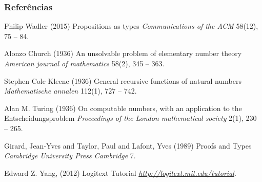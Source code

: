 \documentclass{beamer}
\begin{document}

\begin{frame}[allowframebreaks]
\frametitle{Referências}
\footnotesize{
\begin{thebibliography}{99}
 Philip Wadler (2015)
\newblock Propositions as types
\newblock \emph{Communications of the ACM} 58(12), 75 -- 84.

 Alonzo Church (1936)
\newblock An unsolvable problem of elementary number theory
\newblock \emph{American journal of mathematics} 58(2), 345 -- 363.

 Stephen Cole Kleene (1936)
\newblock General recursive functions of natural numbers
\newblock \emph{Mathematische annalen} 112(1), 727 -- 742.

 Alan M. Turing (1936)
\newblock On computable numbers, with an application to the Entscheidungsproblem
\newblock \emph{Proceedings of the London mathematical society} 2(1), 230 -- 265.

 Girard, Jean-Yves and Taylor, Paul and Lafont, Yves (1989)
\newblock Proofs and Types
\newblock \emph{Cambridge University Press Cambridge} 7.

 Edward Z. Yang, (2012)
\newblock Logitext Tutorial
\newblock \emph{\href{http://logitext.mit.edu/tutorial}{http://logitext.mit.edu/tutorial}}.

\end{thebibliography}
}
\end{frame}

\end{document}
